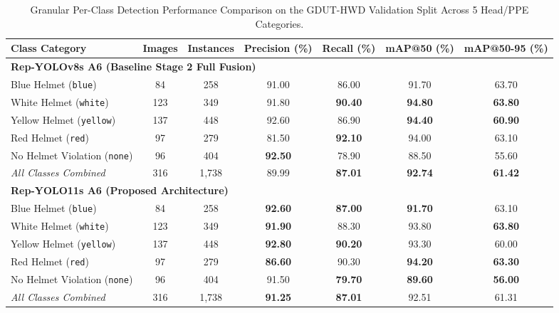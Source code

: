 \documentclass[conference]{IEEEtran}
\begin{document}
\begin{table}[t]
\centering
\caption{Granular Per-Class Detection Performance Comparison on the GDUT-HWD Validation Split Across 5 Head/PPE Categories.}
\label{tab:gdut_per_class_benchmark}
\small
\begin{tabular*}{\textwidth}{@{\extracolsep{\fill}}lcccccc@{}}
\toprule
\textbf{Class Category} & \textbf{Images} & \textbf{Instances} & \textbf{Precision (\%)} & \textbf{Recall (\%)} & \textbf{mAP@50 (\%)} & \textbf{mAP@50-95 (\%)} \\
\midrule
\multicolumn{7}{l}{\textbf{Rep-YOLOv8s A6 (Baseline Stage 2 Full Fusion)}} \\
\quad Blue Helmet (\texttt{blue})    & 84  & 258 & 91.00 & 86.00 & 91.70 & 63.70 \\
\quad White Helmet (\texttt{white})  & 123 & 349 & 91.80 & \textbf{90.40} & \textbf{94.80} & \textbf{63.80} \\
\quad Yellow Helmet (\texttt{yellow})& 137 & 448 & 92.60 & 86.90 & \textbf{94.40} & \textbf{60.90} \\
\quad Red Helmet (\texttt{red})      & 97  & 279 & 81.50 & \textbf{92.10} & 94.00 & 63.10 \\
\quad No Helmet Violation (\texttt{none}) & 96 & 404 & \textbf{92.50} & 78.90 & 88.50 & 55.60 \\
\quad \textit{All Classes Combined}  & 316 & 1,738 & 89.99 & \textbf{87.01} & \textbf{92.74} & \textbf{61.42} \\
\midrule
\multicolumn{7}{l}{\textbf{Rep-YOLO11s A6 (Proposed Architecture)}} \\
\quad Blue Helmet (\texttt{blue})    & 84  & 258 & \textbf{92.60} & \textbf{87.00} & \textbf{91.70} & 63.10 \\
\quad White Helmet (\texttt{white})  & 123 & 349 & \textbf{91.90} & 88.30 & 93.80 & \textbf{63.80} \\
\quad Yellow Helmet (\texttt{yellow})& 137 & 448 & \textbf{92.80} & \textbf{90.20} & 93.30 & 60.00 \\
\quad Red Helmet (\texttt{red})      & 97  & 279 & \textbf{86.60} & 90.30 & \textbf{94.20} & \textbf{63.30} \\
\quad No Helmet Violation (\texttt{none}) & 96 & 404 & 91.50 & \textbf{79.70} & \textbf{89.60} & \textbf{56.00} \\
\quad \textit{All Classes Combined}  & 316 & 1,738 & \textbf{91.25} & \textbf{87.01} & 92.51 & 61.31 \\
\bottomrule
\end{tabular*}
\end{table}
\end{document}
